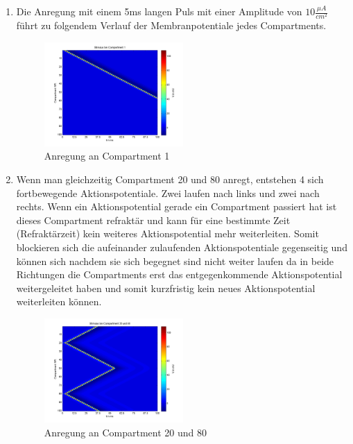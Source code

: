 \documentclass[conference]{IEEEtran}
\begin{document}
\begin{enumerate}

\item Die Anregung mit einem 5ms langen Puls mit einer Amplitude von $10\frac{\mu A}{cm^2}$ führt zu folgendem Verlauf der Membranpotentiale jedes Compartments. 

\begin{figure}[h]
	\centering
	\includegraphics[width=0.5\textwidth]{img/compart1.png}
	\caption{Anregung an Compartment 1}
	\label{fig:compart1}
\end{figure}

\item Wenn man gleichzeitig Compartment 20 und 80 anregt, entstehen 4 sich fortbewegende Aktionspotentiale. Zwei laufen nach links und zwei nach rechts. Wenn ein Aktionspotential gerade ein Compartment passiert hat ist dieses Compartment refraktär und kann für eine bestimmte Zeit (Refraktärzeit) kein weiteres Aktionspotential mehr weiterleiten. Somit blockieren sich die aufeinander zulaufenden Aktionspotentiale gegenseitig und können sich nachdem sie sich begegnet sind nicht weiter laufen da in beide Richtungen die Compartments erst das entgegenkommende Aktionspotential weitergeleitet haben und somit kurzfristig kein neues Aktionspotential weiterleiten können.

\begin{figure}[h]
	\centering
	\includegraphics[width=0.5\textwidth]{img/compart20and80.png}
	\caption{Anregung an Compartment 20 und 80}
	\label{fig:compart20and80}
\end{figure}


\end{enumerate}
\end{document}
